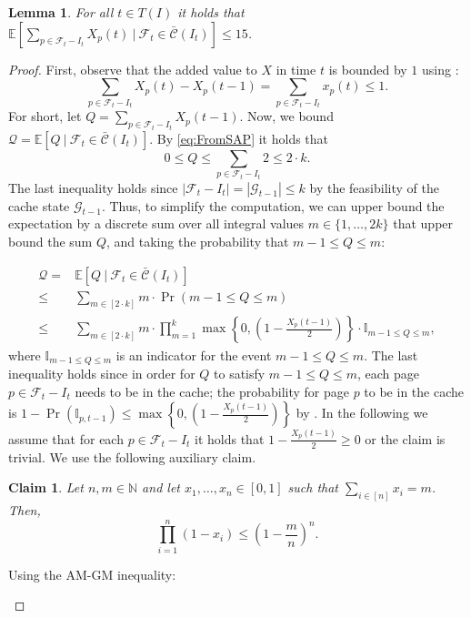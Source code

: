 \documentclass[11pt]{article}
\newcommand{\cG}{{\mathcal{G}}}
\newcommand{\cF}{{\mathcal{F}}}
\newcommand{\cC}{{\mathcal{C}}}
\newcommand{\E}{{\mathbb{E}}}
\newcommand{\bbc}{{\bar{\cC}(I_t)}}
\newtheorem{lemma}[thm]{Lemma}
\newtheorem{claim}[thm]{Claim}
\begin{document}
{	\begin{lemma}
	\label{lem:sumX}
	For all $t \in T(I)$ it holds that $\E \left[ \sum_{p \in \cF_t-I_t} X_p(t) ~\big|~\cF_t \in \bbc \right] \leq 15$. 
\end{lemma}

\begin{proof}
	First, observe that the added value to $X$ in time $t$ is bounded by $1$ using :
	\begin{equation}
		\label{eq:X1}
	\sum_{p \in \cF_t-I_t} X_p(t)-X_p(t-1) = 	\sum_{p \in \cF_t-I_t} x_p(t) \leq 1.
	\end{equation} For short, let $Q = \sum_{p \in \cF_t-I_t} X_p(t-1)$. Now, we bound $\mathcal{Q} = \E \left[ Q ~\big|~\cF_t \in \bbc \right]$. By \eqref{eq:FromSAP} it holds that $$0 \leq Q\leq \sum_{p \in \cF_t-I_t} 2 \leq 2 \cdot k.$$
	The last inequality holds since $|\cF_t-I_t| = |\cG_{t-1}| \leq k$ by the feasibility of the cache state $\cG_{t-1}$. Thus, to simplify the computation, we can upper bound the expectation by a discrete sum over all integral values $m \in \{1,\ldots, 2k\}$ that upper bound the sum $Q$, and taking the probability that $m-1 \leq Q \leq m$:  

\begin{equation}
		\label{eq:sum}
	\begin{aligned}
	\mathcal{Q} = {} &	\E \left[ Q ~\big|~\cF_t \in \bbc \right] \\
	\leq{} & \sum_{m \in \left[ 2 \cdot k\right]} m \cdot \Pr \left(m-1 \leq Q \leq m \right) \\
		\leq{} &  \sum_{m \in \left[ 2 \cdot k\right]} m \cdot \prod_{m=1}^{k} \max \left\{0,\left( 1-\frac{X_p(t-1)}{2}\right) \right\} \cdot \mathbb{I}_{m-1 \leq Q \leq m},
	\end{aligned}
\end{equation}
 where $\mathbb{I}_{m-1 \leq Q \leq m}$ is an indicator for the event $m-1 \leq Q \leq m$. The last inequality holds since in order for $Q$ to satisfy $m-1 \leq Q \leq m$, each page $p \in \cF_t-I_t$ needs to be in the cache; the probability for page $p$ to be in the cache is $1-\Pr\left( \mathbb{I}_{p,{t-1}}\right) \leq \max \left\{0,\left( 1-  \frac{X_p(t-1)}{2}\right)\right\}$ by . In the following we assume that for each $p \in \cF_t-I_t$ it holds that $1-\frac{X_p(t-1)}{2} \geq 0$ or the claim is trivial. We use the following auxiliary claim. 
 
 	\begin{claim}
\label{claim:MAX}
 	Let $n,m \in \mathbb{N}$ and let $x_1,\ldots , x_n \in [0,1]$ such that $\sum_{i \in [n]} x_i = m$. Then, $$\prod^{n}_{i = 1} (1-x_i) \leq \left(1-\frac{m}{n}\right)^n.$$ 
 \end{claim}
 \begin{claimproof}
 	Using the AM-GM inequality:
 	

\end{claimproof}
\end{proof}}
\end{document}
